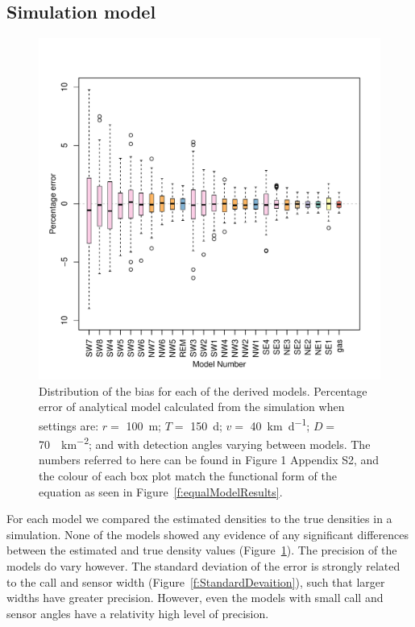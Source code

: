 \documentclass[a4paper,10pt,reqno,oneside]{amsart}
\begin{document}
\subsection{Simulation model}

\begin{figure}
	\centering
	\includegraphics[width=1\textwidth]{imgs/AverageModelBias.pdf}
	\caption{Distribution of the bias for each of the derived models. Percentage error of analytical model calculated from the simulation when settings are: $r = $ \SI{100}{\meter}; $T = $ \SI{150}{\day}; $v = $ \SI{40}{\kilo\meter\per\day}; $D = $ \SI{70}{\animals\per\kilo\meter\squared}; and with detection angles varying between models. The numbers referred to here can be found in Figure 1 Appendix S2, and the colour of each box plot match the functional form of the equation as seen in Figure~\ref{f:equalModelResults}.
  }
	\label{f:ModelBias}
\end{figure}

For each model we compared the estimated densities to the true densities in a simulation. None of the models showed any evidence of any significant differences between the estimated and true density values (Figure~\ref{f:ModelBias}). The precision of the models do vary however. The standard deviation of the error is strongly related to the call and sensor width (Figure~\ref{f:StandardDevaition}), such that larger widths have greater precision. However, even the models with small call and sensor angles have a relativity high level of precision. 
\end{document}
